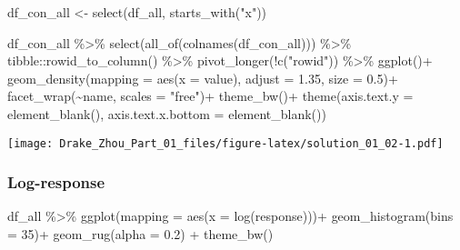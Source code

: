 \documentclass[
]{article}
\newenvironment{Shaded}{\begin{snugshade}}{\end{snugshade}}
\newcommand{\AttributeTok}[1]{\textcolor[rgb]{0.77,0.63,0.00}{#1}}
\newcommand{\DecValTok}[1]{\textcolor[rgb]{0.00,0.00,0.81}{#1}}
\newcommand{\FloatTok}[1]{\textcolor[rgb]{0.00,0.00,0.81}{#1}}
\newcommand{\FunctionTok}[1]{\textcolor[rgb]{0.00,0.00,0.00}{#1}}
\newcommand{\NormalTok}[1]{#1}
\newcommand{\OtherTok}[1]{\textcolor[rgb]{0.56,0.35,0.01}{#1}}
\newcommand{\SpecialCharTok}[1]{\textcolor[rgb]{0.00,0.00,0.00}{#1}}
\newcommand{\StringTok}[1]{\textcolor[rgb]{0.31,0.60,0.02}{#1}}
\begin{document}
\begin{Shaded}
\begin{Highlighting}[]
\NormalTok{df\_con\_all }\OtherTok{\textless{}{-}} \FunctionTok{select}\NormalTok{(df\_all, }\FunctionTok{starts\_with}\NormalTok{(}\StringTok{"x"}\NormalTok{))}

\NormalTok{df\_con\_all }\SpecialCharTok{\%\textgreater{}\%} 
  \FunctionTok{select}\NormalTok{(}\FunctionTok{all\_of}\NormalTok{(}\FunctionTok{colnames}\NormalTok{(df\_con\_all))) }\SpecialCharTok{\%\textgreater{}\%} 
\NormalTok{  tibble}\SpecialCharTok{::}\FunctionTok{rowid\_to\_column}\NormalTok{() }\SpecialCharTok{\%\textgreater{}\%} 
  \FunctionTok{pivot\_longer}\NormalTok{(}\SpecialCharTok{!}\FunctionTok{c}\NormalTok{(}\StringTok{"rowid"}\NormalTok{)) }\SpecialCharTok{\%\textgreater{}\%}
  \FunctionTok{ggplot}\NormalTok{()}\SpecialCharTok{+}
  \FunctionTok{geom\_density}\NormalTok{(}\AttributeTok{mapping =} \FunctionTok{aes}\NormalTok{(}\AttributeTok{x =}\NormalTok{ value), }\AttributeTok{adjust =} \FloatTok{1.35}\NormalTok{, }\AttributeTok{size =} \FloatTok{0.5}\NormalTok{)}\SpecialCharTok{+}
  \FunctionTok{facet\_wrap}\NormalTok{(}\SpecialCharTok{\textasciitilde{}}\NormalTok{name, }\AttributeTok{scales =} \StringTok{"free"}\NormalTok{)}\SpecialCharTok{+}
  \FunctionTok{theme\_bw}\NormalTok{()}\SpecialCharTok{+}
  \FunctionTok{theme}\NormalTok{(}\AttributeTok{axis.text.y =} \FunctionTok{element\_blank}\NormalTok{(), }\AttributeTok{axis.text.x.bottom =} \FunctionTok{element\_blank}\NormalTok{())}
\end{Highlighting}
\end{Shaded}

\texttt{[image: Drake\_Zhou\_Part\_01\_files/figure-latex/solution\_01\_02-1.pdf]}

\hypertarget{log-response}{%
\subsubsection{Log-response}\label{log-response}}

\begin{Shaded}
\begin{Highlighting}[]
\NormalTok{df\_all }\SpecialCharTok{\%\textgreater{}\%} 
  \FunctionTok{ggplot}\NormalTok{(}\AttributeTok{mapping =} \FunctionTok{aes}\NormalTok{(}\AttributeTok{x =} \FunctionTok{log}\NormalTok{(response)))}\SpecialCharTok{+}
  \FunctionTok{geom\_histogram}\NormalTok{(}\AttributeTok{bins =} \DecValTok{35}\NormalTok{)}\SpecialCharTok{+}
  \FunctionTok{geom\_rug}\NormalTok{(}\AttributeTok{alpha =} \FloatTok{0.2}\NormalTok{) }\SpecialCharTok{+}
  \FunctionTok{theme\_bw}\NormalTok{()}
\end{Highlighting}
\end{Shaded}
\end{document}
